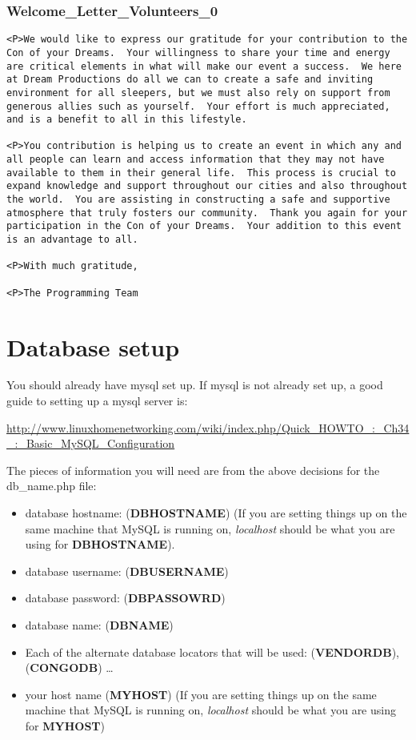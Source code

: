 \documentclass[captions=tablesignature]{scrartcl}
\begin{document}
\subsubsection{Welcome\_Letter\_Volunteers\_0}
\label{sec-3-7-8}
\begin{verbatim}
<P>We would like to express our gratitude for your contribution to the
Con of your Dreams.  Your willingness to share your time and energy
are critical elements in what will make our event a success.  We here
at Dream Productions do all we can to create a safe and inviting
environment for all sleepers, but we must also rely on support from
generous allies such as yourself.  Your effort is much appreciated,
and is a benefit to all in this lifestyle.

<P>You contribution is helping us to create an event in which any and
all people can learn and access information that they may not have
available to them in their general life.  This process is crucial to
expand knowledge and support throughout our cities and also throughout
the world.  You are assisting in constructing a safe and supportive
atmosphere that truly fosters our community.  Thank you again for your
participation in the Con of your Dreams.  Your addition to this event
is an advantage to all.

<P>With much gratitude,

<P>The Programming Team
\end{verbatim}

\section{Database setup}
\label{sec-4}
You should already have mysql set up.  If mysql is not already set
up, a good guide to setting up a mysql server is:

\begin{small}
\url{http://www.linuxhomenetworking.com/wiki/index.php/Quick_HOWTO_:_Ch34_:_Basic_MySQL_Configuration}
\end{small}

The pieces of information you will need are from the above decisions
for the db\_name.php file:

\begin{itemize}
\item database hostname: (\textbf{DBHOSTNAME}) (If you are setting things up on
the same machine that MySQL is running on, \emph{localhost} should be
what you are using for \textbf{DBHOSTNAME}).
\item database username: (\textbf{DBUSERNAME})
\item database password: (\textbf{DBPASSOWRD})
\item database name: (\textbf{DBNAME})
\item Each of the alternate database locators that will be used:
(\textbf{VENDORDB}), (\textbf{CONGODB}) \ldots{}
\item your host name (\textbf{MYHOST}) (If you are setting things up on the
same machine that MySQL is running on, \emph{localhost} should be what
you are using for \textbf{MYHOST})
\end{itemize}
\end{document}
